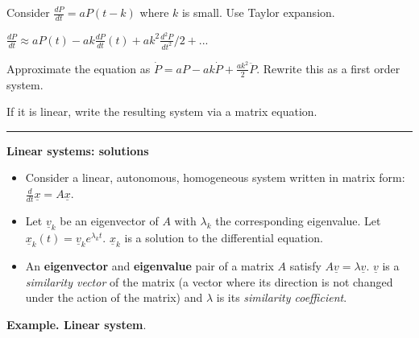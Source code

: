 \documentclass[12pt,letterpaper,noanswers]{exam}
\begin{document}
Consider $\frac{dP}{dt} = aP(t-k)$ where $k$ is small.  Use Taylor expansion.

$\frac{dP}{dt} \approx aP(t) -ak\frac{dP}{dt}(t) +ak^2 \frac{d^2P}{dt^2}/2 + ...$

Approximate the equation as $\dot P = aP - ak\dot P + \frac{ak^2}{2}\ddot P$.  Rewrite this as a first order system.

If it is linear, write the resulting system via a matrix equation.

\vspace{1.7in}

\eject

\vspace{0.2cm}
\hrule
\vspace{0.2cm}



\noindent\textbf{Linear systems: solutions}
\begin{tcolorbox}
\begin{itemize}
\itemsep0em
    \item Consider a linear, autonomous, homogeneous system written in matrix form: $\frac{d}{dt}\underline x = A \underline x$.  
    \item Let $\underline v_k$ be an eigenvector of $A$ with $\lambda_k$ the corresponding eigenvalue.  Let $\underline x_k(t) = \underline v_k e^{\lambda_k t}$.  $\underline x_k$ is a solution to the differential equation.
    \item An \textbf{eigenvector} and \textbf{eigenvalue} pair of a matrix $A$ satisfy $A\underline v = \lambda\underline v$.  $\underline v$ is a \emph{similarity vector} of the matrix (a vector where its direction is not changed under the action of the matrix) and $\lambda$ is its \emph{similarity coefficient}.
\end{itemize}
\end{tcolorbox}
\noindent\textbf{Example.  Linear system}.  
\end{document}
